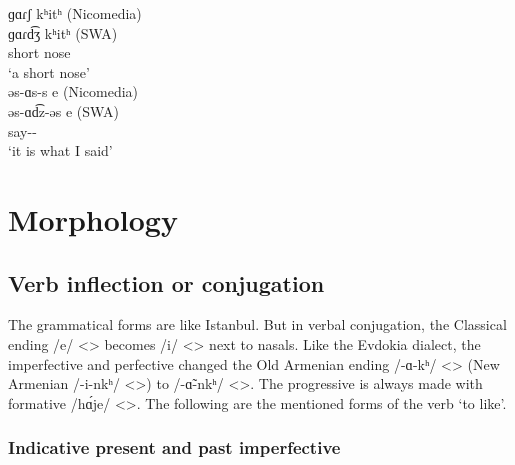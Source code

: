 \begin{exe}
	\ex \label{sent:Nicomedia:phonology:change:cons:voicing}
	\begin{xlist}
		\ex \glll ɡɑɾʃ kʰitʰ (Nicomedia) \\
		ɡɑɾd͡ʒ kʰitʰ (SWA)\\
		short nose \\
		\trans `a short nose'\\
		\ex \glll əs-ɑs-s e (Nicomedia) \\
		əs-ɑd͡z-əs e (SWA)\\
		say-{\rptcp}-{\possFsg} {\aux} \\
		\trans `it is what I said'\\
		
	\end{xlist}
\end{exe}
\section{Morphology}
\subsection{Verb inflection or conjugation}
The grammatical forms are like Istanbul. But in verbal conjugation, the Classical ending /e/ <> becomes /i/ <> next to nasals. Like the Evdokia dialect, the imperfective and perfective changed the Old Armenian ending /-ɑ-kʰ/ <> (New Armenian /-i-nkʰ/ <>) to /-ɑ̃-nkʰ/ <>. The progressive is always made with formative /h\'ɑje/ <>. The following are the mentioned forms of the verb `to like'. 

{\paradigmExplanation}

\subsubsection{Indicative present and past imperfective}





